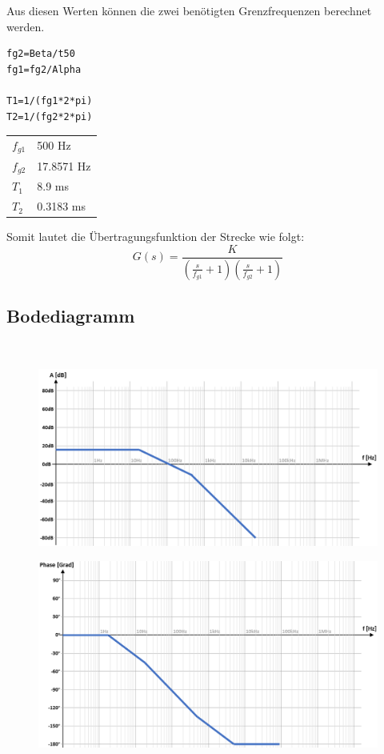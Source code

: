 \documentclass[twoside]{article}
\begin{document}
Aus diesen Werten können die zwei benötigten Grenzfrequenzen berechnet werden.
\begin{verbatim}
fg2=Beta/t50
fg1=fg2/Alpha

T1=1/(fg1*2*pi)
T2=1/(fg2*2*pi)
\end{verbatim}

\begin{tabular}{l l}
    $f_{g1}$ & 500 Hz \\
    $f_{g2}$ & 17.8571 Hz \\
    $T_{1}$ &  8.9 ms\\
    $T_{2}$ &  0.3183 ms\\
\end{tabular}

Somit lautet die Übertragungsfunktion der Strecke wie folgt:
\begin{equation}
    G(s) = \frac{K}{\left(\frac{s}{f_{g1}} + 1\right)\left(\frac{s}{f_{g2}} + 1\right)}
\end{equation}
\newpage
\subsection{Bodediagramm}\mbox{}\\
\begin{figure}[h]
    \centering
    \includegraphics[width=0.9\linewidth]{img/Bode_01.png}
\end{figure}
\begin{figure}[h]
    \centering
    \includegraphics[width=0.9\linewidth]{img/Bode_02.png}
\end{figure}
\end{document}
